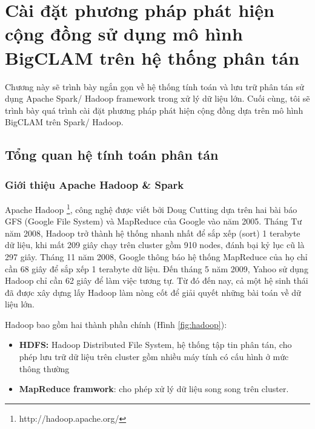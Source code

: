 \chapter{Cài đặt phương pháp phát hiện cộng đồng sử dụng mô hình BigCLAM trên hệ thống phân tán}\label{chap:c4}
\ifpdf
    \graphicspath{{Chapter3/Chapter3Figs/PNG/}{Chapter3/Chapter3Figs/PDF/}{Chapter3/Chapter3Figs/}}
\else
    \graphicspath{{Chapter3/Chapter3Figs/EPS/}{Chapter3/Chapter3Figs/}}
\fi
Chương này sẽ trình bày ngắn gọn về hệ thống tính toán và lưu trữ phân tán sử dụng Apache Spark/ Hadoop framework trong xử lý dữ liệu lớn. Cuối cùng, tôi sẽ trình bày quá trình cài đặt phương pháp phát hiện cộng đồng dựa trên mô hình BigCLAM trên Spark/ Hadoop.
\section{Tổng quan hệ tính toán phân tán}
\subsection{Giới thiệu Apache Hadoop \& Spark}

Apache Hadoop \footnote{http://hadoop.apache.org/}, công nghệ được viết bởi Doug Cutting dựa trên hai bài báo GFS (Google File System) và MapReduce của Google vào năm 2005. Tháng Tư năm 2008, Hadoop trở thành hệ thống nhanh nhất để sắp xếp (sort) 1 terabyte dữ liệu, khi mất 209 giây chạy trên cluster gồm 910 nodes, đánh bại kỷ lục cũ là 297 giây. Tháng 11 năm 2008, Google thông báo hệ thống MapReduce của họ chỉ cần 68 giây để sắp xếp 1 terabyte dữ liệu. Đến tháng 5 năm 2009, Yahoo sử dụng Hadoop chỉ cần 62 giây để làm việc tương tự. Từ đó đến nay, cả một hệ sinh thái đã được xây dựng lấy Hadoop làm nòng cốt để giải quyết những bài toán về dữ liệu lớn.


Hadoop bao gồm hai thành phần chính (Hình \ref{fig:hadoop}):
\begin{itemize}
	\item \textbf{HDFS:} Hadoop Distributed File System, hệ thống tập tin phân tán, cho phép lưu trữ dữ liệu trên cluster gồm nhiều máy tính có cấu hình ở mức thông thường
	\item \textbf{MapReduce framwork}: cho phép xử lý dữ liệu song song trên cluster.
\end{itemize}


